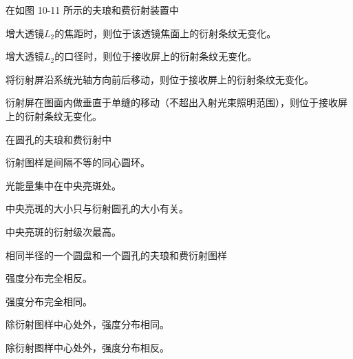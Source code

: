 \documentclass[padl, analysis, notocnum]{ExBook}
\newcommand{\answerarea}[1][3.5cm]{%
  \par\vspace{1mm}%
  \noindent{\color{themeColor!35}\rule{\linewidth}{0.4pt}}\par
  \noindent\begin{minipage}[t][#1][t]{\linewidth}\vspace{0pt}\end{minipage}\par
  \noindent{\color{themeColor!35}\rule{\linewidth}{0.4pt}}\par
}
\begin{document}
\begin{qitems}[startnum=6]
\qitem 在如图 10-11 所示的夫琅和费衍射装置中
\par\noindent\hspace{2em}增大透镜$L_{2}$的焦距时，则位于该透镜焦面上的衍射条纹无变化。
\par\noindent\hspace{2em}增大透镜$L_{2}$的口径时，则位于接收屏上的衍射条纹无变化。
\par\noindent\hspace{2em}将衍射屏沿系统光轴方向前后移动，则位于接收屏上的衍射条纹无变化。
\par\noindent\hspace{2em}衍射屏在图面内做垂直于单缝的移动（不超出入射光束照明范围），则位于接收屏上的衍射条纹无变化。
\label{q:264:start}
\answerarea[1.6cm]
\label{q:264:end}
\end{qitems}

\begin{qitems}[startnum=7]
\qitem 在圆孔的夫琅和费衍射中
\par\noindent\hspace{2em}衍射图样是间隔不等的同心圆环。
\par\noindent\hspace{2em}光能量集中在中央亮斑处。
\par\noindent\hspace{2em}中央亮斑的大小只与衍射圆孔的大小有关。
\par\noindent\hspace{2em}中央亮斑的衍射级次最高。
\label{q:265:start}
\answerarea[4.0cm]
\label{q:265:end}
\end{qitems}

\begin{qitems}[startnum=8]
\qitem 相同半径的一个圆盘和一个圆孔的夫琅和费衍射图样
\par\noindent\hspace{2em}强度分布完全相反。
\par\noindent\hspace{2em}强度分布完全相同。
\par\noindent\hspace{2em}除衍射图样中心处外，强度分布相同。
\par\noindent\hspace{2em}除衍射图样中心处外，强度分布相反。
\label{q:266:start}
\answerarea[4.0cm]
\label{q:266:end}
\end{qitems}
\end{document}
